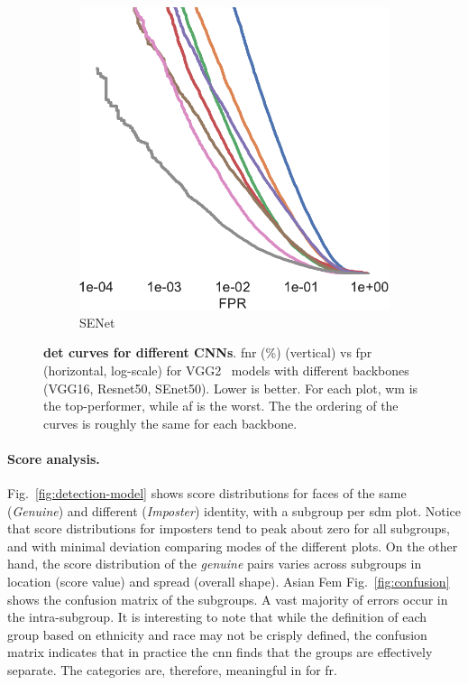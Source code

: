 \begin{figure}[h!]
\begin{subfigure}[t]{.27\linewidth}
    \includegraphics[width=.75\linewidth]{figures/curve_senet50_subgroups-crop.pdf}
    \caption{SENet~\cite{hu2018squeeze}}
    \end{subfigure}
    \caption{\small{\textbf{\gls{det} curves for different CNNs}. \gls{fnr} (\%) (vertical) vs \gls{fpr}  (horizontal, log-scale) for VGG2~\cite{Cao18} models with different backbones (VGG16, Resnet50, SEnet50). Lower is better. For each plot, \gls{wm} is the top-performer, while \gls{af} is the worst. The the ordering of the curves is roughly the same for each backbone.}}\label{fig:sdm-appendix-a}
    \vspace{-5mm}
\end{figure}
\noindent\paragraph{Score analysis.}
Fig.~\ref{fig:detection-model} shows score distributions for faces of the same (\ie \emph{Genuine}) and different (\ie \emph{Imposter}) identity, with a subgroup per \gls{sdm} plot. Notice that score distributions for imposters tend to peak about zero for all subgroups, and with minimal deviation comparing modes of the different plots. On the other hand, the score distribution of the \emph{genuine} pairs varies across subgroups in location (\ie score value) and spread (\ie overall shape). Asian Fem
Fig.~\ref{fig:confusion} shows the confusion matrix of the subgroups. A vast majority of errors occur in the intra-subgroup. It is interesting to note that while the definition of  each group  based on ethnicity and race may not be crisply defined, the confusion matrix indicates that in practice the \gls{cnn} finds that the groups are effectively separate. The categories are, therefore, meaningful in for \gls{fr}.








